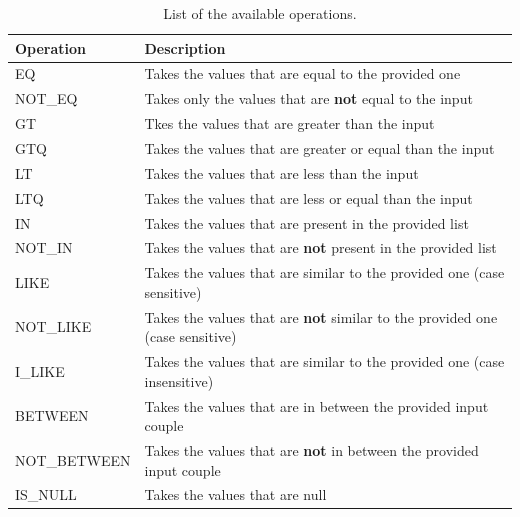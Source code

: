 \begin{table}[!htb]   
\small
  \centering
  \caption{List of the available operations.}
  \begin{tabular}{|l|p{9cm}|}\hline
    Operation    & Description                                                                         \\\hline
    EQ           & Takes the values that are equal to the provided one                                 \\\hline
    NOT\_EQ      & Takes only the values that are \textbf{not} equal to the input                      \\\hline
    GT           & Tkes the values that are greater than the input                                     \\\hline
    GTQ          & Takes the values that are greater or equal than the input                           \\\hline
    LT           & Takes the values that are less than the input                                       \\\hline
    LTQ          & Takes the values that are less or equal than the input                              \\\hline
    IN           & Takes the values that are present in the provided list                              \\\hline
    NOT\_IN      & Takes the values that are \textbf{not} present in the provided list                 \\\hline
    LIKE         & Takes the values that are similar to the provided one (case sensitive)              \\\hline
    NOT\_LIKE    & Takes the values that are \textbf{not} similar to the provided one (case sensitive) \\\hline
    I\_LIKE      & Takes the values that are similar to the provided one (case insensitive)            \\\hline
    BETWEEN      & Takes the values that are in between the provided input couple                      \\\hline
    NOT\_BETWEEN & Takes the values that are \textbf{not} in between the provided input couple         \\\hline
    IS\_NULL     & Takes the values that are null                                                      \\\hline
  \end{tabular}
  
  \label{tab:filtering}
\end{table}


